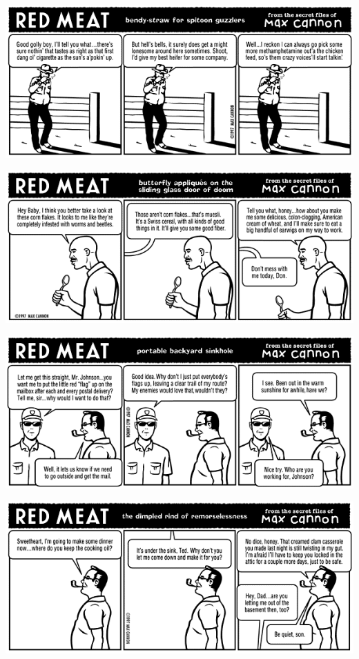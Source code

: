 \documentclass[a4paper,twoside,11pt]{article}
\begin{document}
\includegraphics[width=\textwidth]{redmeat_1997-05-12.png}



\includegraphics[width=\textwidth]{redmeat_1997-05-19.png}



\includegraphics[width=\textwidth]{redmeat_1997-05-26.png}



\includegraphics[width=\textwidth]{redmeat_1997-06-02.png}
\end{document}
